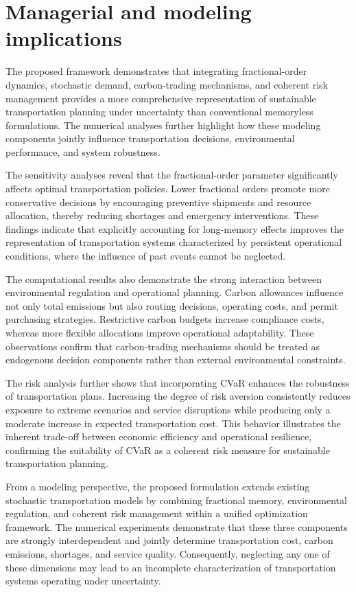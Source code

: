\section{Managerial and modeling implications}

The proposed framework demonstrates that integrating fractional-order dynamics, stochastic demand, carbon-trading mechanisms, and coherent risk management provides a more comprehensive representation of sustainable transportation planning under uncertainty than conventional memoryless formulations. The numerical analyses further highlight how these modeling components jointly influence transportation decisions, environmental performance, and system robustness.

The sensitivity analyses reveal that the fractional-order parameter significantly affects optimal transportation policies. Lower fractional orders promote more conservative decisions by encouraging preventive shipments and resource allocation, thereby reducing shortages and emergency interventions. These findings indicate that explicitly accounting for long-memory effects improves the representation of transportation systems characterized by persistent operational conditions, where the influence of past events cannot be neglected.

The computational results also demonstrate the strong interaction between environmental regulation and operational planning. Carbon allowances influence not only total emissions but also routing decisions, operating costs, and permit purchasing strategies. Restrictive carbon budgets increase compliance costs, whereas more flexible allocations improve operational adaptability. These observations confirm that carbon-trading mechanisms should be treated as endogenous decision components rather than external environmental constraints.

The risk analysis further shows that incorporating CVaR enhances the robustness of transportation plans. Increasing the degree of risk aversion consistently reduces exposure to extreme scenarios and service disruptions while producing only a moderate increase in expected transportation cost. This behavior illustrates the inherent trade-off between economic efficiency and operational resilience, confirming the suitability of CVaR as a coherent risk measure for sustainable transportation planning.

From a modeling perspective, the proposed formulation extends existing stochastic transportation models by combining fractional memory, environmental regulation, and coherent risk management within a unified optimization framework. The numerical experiments demonstrate that these three components are strongly interdependent and jointly determine transportation cost, carbon emissions, shortages, and service quality. Consequently, neglecting any one of these dimensions may lead to an incomplete characterization of transportation systems operating under uncertainty.

